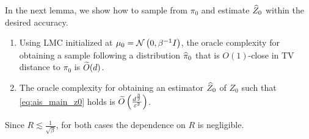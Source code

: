 In the next lemma, we show how to sample from $\pi_0$ and estimate $\widehat{Z}_0$ within the desired accuracy.
\begin{lemma}
\begin{enumerate}[wide=0pt,itemsep=0pt, topsep=0pt,parsep=0pt,partopsep=0pt]
    \item Using LMC initialized at $\mu_0=\operatorname{\mathcal{N}}\left(0,\beta^{-1}I\right)$, the oracle complexity for obtaining a sample following a distribution $\widehat{\pi}_0$ that is $O(1)$-close in TV distance to $\pi_0$ is $\widetilde{O}(d)$.
    \item The oracle complexity for obtaining an estimator $\widehat{Z}_0$ of $Z_0$ such that \cref{eq:ais_main_z0} holds is $\widetilde{O}\left(\frac{d^{\frac{3}{2}}}{\varepsilon^2}\right)$.
\end{enumerate}
\label{lem:ais_est_z0}
\end{lemma}

\begin{remark}
    Since $R\lesssim\frac{1}{\sqrt{\beta}}$, for both cases the dependence on $R$ is negligible.
\end{remark}

